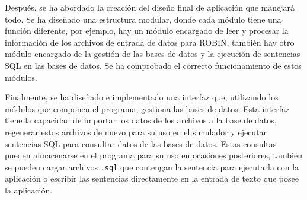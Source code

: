 \begin{resumen}
Después, se ha abordado la creación del diseño final de aplicación que manejará todo. Se ha diseñado una estructura modular, donde cada módulo tiene una función diferente, por ejemplo, hay un módulo encargado de leer y procesar la información de los archivos de entrada de datos para \acrshort{ROBIN}, también hay otro módulo encargado de la gestión de las bases de datos y la ejecución de sentencias \acrshort{SQL} en las bases de datos. Se ha comprobado el correcto funcionamiento de estos módulos.

Finalmente, se ha diseñado e implementado una interfaz que, utilizando los módulos que componen el programa, gestiona las bases de datos. Esta interfaz tiene la capacidad de importar los datos de los archivos a la base de datos, regenerar estos archivos de nuevo para su uso en el simulador y ejecutar sentencias SQL para consultar datos de las bases de datos. Estas consultas pueden almacenarse en el programa para su uso en ocasiones posteriores, también se pueden cargar archivos \texttt{.sql} que contengan la sentencia para ejecutarla con la aplicación o escribir las sentencias directamente en la entrada de texto que posee la aplicación.


\end{resumen}

